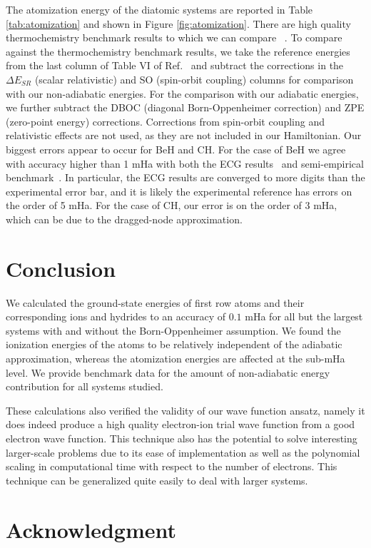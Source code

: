 \documentclass[pra,superscriptaddress,groupedaddress,twocolumn]{revtex4}
\begin{document}
The atomization energy of the diatomic systems are reported in Table \ref{tab:atomization} and shown in Figure \ref{fig:atomization}. There are high quality thermochemistry benchmark results to which we can compare ~\cite{Feller_Corrections}. To compare against the thermochemistry benchmark results, we take the reference energies from the last column of Table VI of Ref.~\cite{Feller_Corrections} and subtract the corrections in the $\Delta E_{SR}$ (scalar relativistic) and SO (spin-orbit coupling) columns for comparison with our non-adiabatic energies. For the comparison with our adiabatic energies, we further subtract the DBOC (diagonal Born-Oppenheimer correction) and ZPE (zero-point energy) corrections. Corrections from spin-orbit coupling and relativistic effects are not used, as they are not included in our Hamiltonian. Our biggest errors appear to occur for BeH and CH. For the case of BeH we agree with accuracy higher than 1 mHa with both the ECG results~\cite{Bubin_BeH_noBO} and semi-empirical benchmark~\cite{Feller_Corrections,Davidson_Atoms}. In particular, the ECG results are converged to more digits than the experimental error bar, and it is likely the experimental reference has errors on the order of 5 mHa. For the case of CH, our error is on the order of 3 mHa, which can be due to the dragged-node approximation. 

\section{Conclusion}
We calculated the ground-state energies of first row atoms and their corresponding ions and hydrides to an accuracy of $0.1$ mHa for all but the largest systems with and without the Born-Oppenheimer assumption. We found the ionization energies of the atoms to be relatively independent of the adiabatic approximation, whereas the atomization energies are affected at the sub-mHa level. We provide benchmark data for the amount of non-adiabatic energy contribution for all systems studied. %

These calculations also verified the validity of our wave function ansatz, namely it does indeed produce a high quality electron-ion trial wave function from a good electron wave function. This technique also has the potential to solve interesting larger-scale problems due to its ease of implementation as well as the polynomial scaling in computational time with respect to the number of electrons.  This technique can be generalized quite easily to deal with larger systems.

\section{Acknowledgment}



\end{document}
